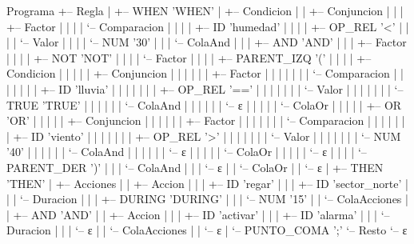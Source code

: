 Programa
+-- Regla
|   +-- WHEN 'WHEN'
|   +-- Condicion
|   |   +-- Conjuncion
|   |   |   +-- Factor
|   |   |   |   `-- Comparacion
|   |   |   |       +-- ID 'humedad'
|   |   |   |       +-- OP_REL '<'
|   |   |   |       `-- Valor
|   |   |   |           `-- NUM '30'
|   |   |   `-- ColaAnd
|   |   |       +-- AND 'AND'
|   |   |       +-- Factor
|   |   |       |   +-- NOT 'NOT'
|   |   |       |   `-- Factor
|   |   |       |       +-- PARENT_IZQ '('
|   |   |       |       +-- Condicion
|   |   |       |       |   +-- Conjuncion
|   |   |       |       |   |   +-- Factor
|   |   |       |       |   |   |   `-- Comparacion
|   |   |       |       |   |   |       +-- ID 'lluvia'
|   |   |       |       |   |   |       +-- OP_REL '=='
|   |   |       |       |   |   |       `-- Valor
|   |   |       |       |   |   |           `-- TRUE 'TRUE'
|   |   |       |       |   |   `-- ColaAnd
|   |   |       |       |   |       `-- ε
|   |   |       |       |   `-- ColaOr
|   |   |       |       |       +-- OR 'OR'
|   |   |       |       |       +-- Conjuncion
|   |   |       |       |       |   +-- Factor
|   |   |       |       |       |   |   `-- Comparacion
|   |   |       |       |       |   |       +-- ID 'viento'
|   |   |       |       |       |   |       +-- OP_REL '>'
|   |   |       |       |       |   |       `-- Valor
|   |   |       |       |       |   |           `-- NUM '40'
|   |   |       |       |       |   `-- ColaAnd
|   |   |       |       |       |       `-- ε
|   |   |       |       |       `-- ColaOr
|   |   |       |       |           `-- ε
|   |   |       |       `-- PARENT_DER ')'
|   |   |       `-- ColaAnd
|   |   |           `-- ε
|   |   `-- ColaOr
|   |       `-- ε
|   +-- THEN 'THEN'
|   +-- Acciones
|   |   +-- Accion
|   |   |   +-- ID 'regar'
|   |   |   +-- ID 'sector_norte'
|   |   |   `-- Duracion
|   |   |       +-- DURING 'DURING'
|   |   |       `-- NUM '15'
|   |   `-- ColaAcciones
|   |       +-- AND 'AND'
|   |       +-- Accion
|   |       |   +-- ID 'activar'
|   |       |   +-- ID 'alarma'
|   |       |   `-- Duracion
|   |       |       `-- ε
|   |       `-- ColaAcciones
|   |           `-- ε
|   `-- PUNTO_COMA ';'
`-- Resto
    `-- ε

